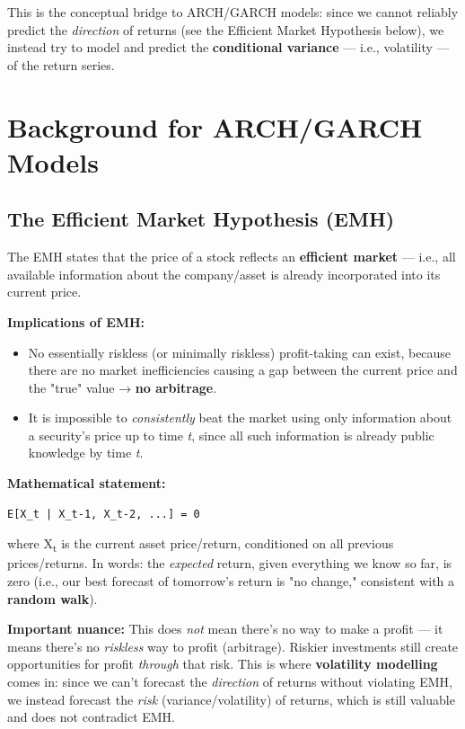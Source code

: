 \documentclass[12pt,openany]{book}
\theoremstyle{definition}
\theoremstyle{remark}
\begin{document}
This is the conceptual bridge to ARCH/GARCH models: since we cannot reliably predict the \emph{direction} of returns (see the Efficient Market Hypothesis below), we instead try to model and predict the \textbf{conditional variance} — i.e., volatility — of the return series.


\section{Background for ARCH/GARCH Models}

\subsection{The Efficient Market Hypothesis (EMH)}

The EMH states that the price of a stock reflects an \textbf{efficient market} — i.e., all available information about the company/asset is already incorporated into its current price.

\textbf{Implications of EMH:}
\begin{itemize}
\item No essentially riskless (or minimally riskless) profit-taking can exist, because there are no market inefficiencies causing a gap between the current price and the "true" value → \textbf{no arbitrage}.
\item It is impossible to \emph{consistently} beat the market using only information about a security's price up to time \emph{t}, since all such information is already public knowledge by time \emph{t}.
\end{itemize}

\textbf{Mathematical statement:}

\begin{lstlisting}[style=notesCode]
E[X_t | X_t-1, X_t-2, ...] = 0
\end{lstlisting}

where X\textsubscript{t} is the current asset price/return, conditioned on all previous prices/returns. In words: the \emph{expected} return, given everything we know so far, is zero (i.e., our best forecast of tomorrow's return is "no change," consistent with a \textbf{random walk}).

\textbf{Important nuance:} This does \emph{not} mean there's no way to make a profit — it means there's no \emph{riskless} way to profit (arbitrage). Riskier investments still create opportunities for profit \emph{through} that risk. This is where \textbf{volatility modelling} comes in: since we can't forecast the \emph{direction} of returns without violating EMH, we instead forecast the \emph{risk} (variance/volatility) of returns, which is still valuable and does not contradict EMH.
\end{document}
